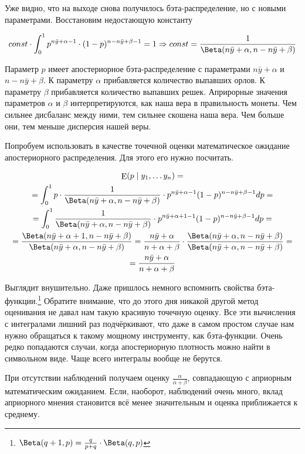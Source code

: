 \documentclass[12pt, a4paper, oneside]{extreport}
\DeclareMathOperator{\E}{\mathop{E}}
\def \b{\beta}
\theoremstyle{plain}              %
\theoremstyle{definition}         %
\begin{document}
Уже видно, что на выходе снова получилось бэта-распределение, но с новыми параметрами. Восстановим недостающую константу

\[ const \cdot \int_0^1 p^{n \bar y + \alpha - 1} \cdot (1-p)^{n - n\bar y + \b - 1} = 1 \Rightarrow  const = \frac{1}{\Beta(n \bar y + \alpha, n-n \bar y + \beta)} \]

Параметр $p$ имеет апостериорное бэта-распределение с параметрами $n \bar y + \alpha$ и $ n - n \bar y + \beta$.  К параметру $\alpha$ прибавляется количество выпавших орлов. К параметру $\beta$ прибавляется количество выпавших решек. Априрорные значения параметров $\alpha$ и $\beta$  интерпретируются, как наша вера в правильность монеты. Чем сильнее дисбаланс между ними, тем сильнее скошена наша вера. Чем больше они, тем меньше дисперсия нашей веры. 

Попробуем использовать в качестве точечной оценки математическое ожидание апостериорного распределения. Для этого его нужно посчитать. 

	\begin{multline*}
\E(p \mid y_1, \ldots y_n)  = \\ =  \int_0^1 p \cdot \frac{1}{\Beta(n \bar y + \alpha,n-n \bar y + \b)} \cdot p^{n \bar y + \alpha - 1} (1-p)^{n - n \bar{y} + \beta - 1} dp = \\ = \int_0^1 \frac{1}{\Beta(n \bar y + \alpha ,n-n \bar y + \beta)} \cdot p^{n \bar y + \alpha + 1 - 1} (1-p)^{n - n \bar{y} + \beta - 1} dp =  \\ =   \frac{\Beta(n \bar y + \alpha + 1,n-n \bar y + \beta)}{\Beta(n \bar y + \alpha, n-n \bar y + \beta)} =  \frac{n \bar y + \alpha}{n + \alpha + \b} \cdot \frac{\Beta(n \bar y + \alpha,n-n \bar y + \beta)}{\Beta(n \bar y + \alpha, n-n \bar y + \beta)} = \\ =\frac{n \bar y + \alpha}{n + \alpha + \beta}
\end{multline*}

Выглядит внушительно. Даже пришлось немного вспомнить свойства бэта-функции.\footnote{$\Beta(q+1, p) = \frac{q}{p+q} \cdot \Beta(q,p)$}  Обратите внимание, что до этого дня никакой другой метод оценивания не давал нам такую красивую точечную оценку. Все эти вычисления с интегралами лишний раз подчёркивают, что даже в самом простом случае нам нужно обращаться к такому мощному инструменту, как бэта-функции. Очень редко попадаются случаи, когда апостериорную плотность можно найти в символьном виде. Чаще всего интегралы вообще не берутся.  

При отсутствии наблюдений получаем оценку $\frac{\alpha}{\alpha + \b}$, совпадающую с априорным математическим ожиданием. Если, наоборот, наблюдений очень много, вклад априорного мнения становится всё менее значительным и оценка приближается к среднему. 
\end{document}
